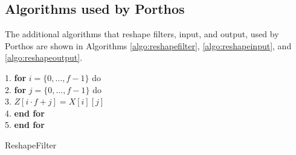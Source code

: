 \begin{comment}
\end{itemize}
\end{comment}
\subsection{Algorithms used by Porthos}\label{appendix:porthos}
The additional algorithms that reshape filters, input, and output, used by Porthos are shown in Algorithms \ref{algo:reshapefilter}, \ref{algo:reshapeinput}, and \ref{algo:reshapeoutput}.

\begin{algorithm}[h]
1. \textbf{for} $i = \{0, ..., f-1\}$ do \\
2. \hspace{10mm} \textbf{for} $j = \{0, ..., f-1\}$ do \\
3. \hspace{10mm} \hspace{10mm} $Z[i \cdot f + j] = X[i][j]$\\
4. \hspace{10mm} \textbf{end for}\\
5. \textbf{end for}

    \caption{{ ReshapeFilter} \label{algo:reshapefilter}}

\end{algorithm}

